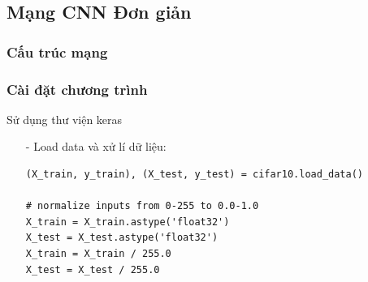 \documentclass[a4paper,12pt]{report}
\begin{document}
\subsection{Mạng CNN Đơn giản}
\subsubsection{Cấu trúc mạng}
\subsubsection{Cài đặt chương trình}
Sử dụng thư viện keras
\begin{itemize}
\item[-] Load data và xử lí dữ liệu:
\begin{lstlisting}
(X_train, y_train), (X_test, y_test) = cifar10.load_data()

# normalize inputs from 0-255 to 0.0-1.0
X_train = X_train.astype('float32')
X_test = X_test.astype('float32')
X_train = X_train / 255.0
X_test = X_test / 255.0



\end{lstlisting}
\end{itemize}
\end{document}
